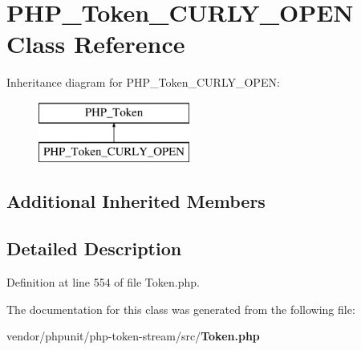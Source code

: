 \section{P\+H\+P\+\_\+\+Token\+\_\+\+C\+U\+R\+L\+Y\+\_\+\+O\+P\+E\+N Class Reference}
\label{class_p_h_p___token___c_u_r_l_y___o_p_e_n}
Inheritance diagram for P\+H\+P\+\_\+\+Token\+\_\+\+C\+U\+R\+L\+Y\+\_\+\+O\+P\+E\+N\+:\begin{figure}[H]
\begin{center}
\leavevmode
\includegraphics[height=2.000000cm]{class_p_h_p___token___c_u_r_l_y___o_p_e_n}
\end{center}
\end{figure}
\subsection*{Additional Inherited Members}


\subsection{Detailed Description}


Definition at line 554 of file Token.\+php.



The documentation for this class was generated from the following file\+:\begin{DoxyCompactItemize}
\item 
vendor/phpunit/php-\/token-\/stream/src/{\bf Token.\+php}\end{DoxyCompactItemize}
